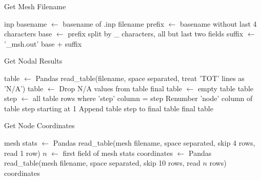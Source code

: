\begin{algorithm}[tbp]
  \caption{Get Mesh Filename}
  \label{alg:get_mesh_filename}
  \begin{algorithmic}
    \State inp basename $\gets$ basename of .inp filename
    \State prefix $\gets$ basename without last 4 characters 
    \State base $\gets$ prefix split by \_ characters, all but last two fields
    \State suffix $\gets$ '\_msh.out'
    \State \Return base + suffix 
    \EndProcedure
  \end{algorithmic}
\end{algorithm}

\begin{algorithm}[tbp]
  \caption{Get Nodal Results}
  \label{alg:get_nodal_results}
  \begin{algorithmic}
  \State table $\gets$ Pandas read\_table(filename, space separated, treat 'TOT' lines as 'N/A')
  \State table $\gets$ Drop N/A values from table
  \State final table $\gets$ empty table
    \State table step $\gets$ all table rows where 'step' column = step
    \State Renumber 'node' column of table step starting at 1
    \State {}
    \State Append table step to final table
  \EndFor
  \State \Return final table
  \EndProcedure
  \end{algorithmic}
\end{algorithm}

\begin{algorithm}[tbp]
  \caption{Get Node Coordinates}
  \label{alg:get_node_coordinates}
  \begin{algorithmic}
  \State mesh stats $\gets$ Pandas read\_table(mesh filename, space separated, skip 4 rows, read 1 row)
  \State $n$ $\gets$ first field of mesh stats
  \State coordinates $\gets$ Pandas read\_table(mesh filename, space separated, skip 10 rows, read $n$ rows)
  \State \Return coordinates
  \EndProcedure
  \end{algorithmic}
\end{algorithm}

